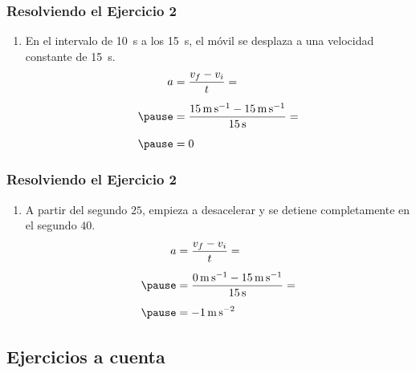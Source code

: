 \documentclass[14pt]{beamer}
\begin{document}
\begin{frame}
\frametitle{Resolviendo el Ejercicio 2}
\begin{enumerate}[<+->]
\conti
\item En el intervalo de \SI{10}{\second} a los \SI{15}{\second}, el móvil se desplaza a una velocidad constante de \SI{15}{\second}.
\\
\bigskip
\pause
\begin{eqnarray*}
\begin{aligned}
a &= \dfrac{v_{f} - v_{i}}{t} = \\[0.5em] \pause
&= \dfrac{\SI{15}{\meter\per\second} - \SI{15}{\meter\per\second}}{\SI{15}{\second}} = \\[0.5em] \pause
&= 0
\end{aligned}
\end{eqnarray*}
\seti
\end{enumerate}
\end{frame}
\begin{frame}
\frametitle{Resolviendo el Ejercicio 2}
\begin{enumerate}[<+->]
\conti
\item A partir del segundo $25$, empieza a desacelerar y se detiene completamente en el segundo $40$.
\pause
\begin{eqnarray*}
\begin{aligned}
a &= \dfrac{v_{f} - v_{i}}{t} = \\[0.5em] \pause
&= \dfrac{\SI{0}{\meter\per\second} - \SI{15}{\meter\per\second}}{\SI{15}{\second}} = \\[0.5em] \pause
&= \SI{-1}{\meter\per\square\second}
\end{aligned}
\end{eqnarray*}
\end{enumerate}
\end{frame}

\subsection{Ejercicios a cuenta}
\end{document}
